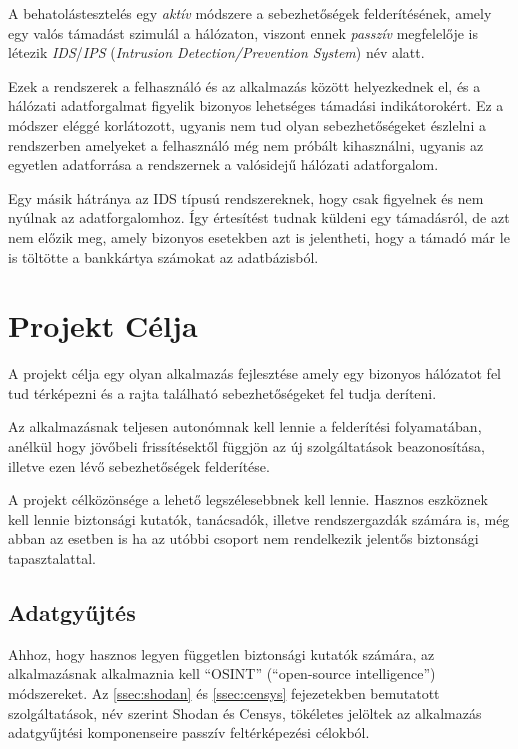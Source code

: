 \documentclass[a4paper,12pt]{article}
\begin{document}
	A behatolástesztelés egy \textit{aktív} módszere a sebezhetőségek felderítésének, amely egy valós támadást szimulál a hálózaton, viszont ennek \textit{passzív} megfelelője is létezik \textit{IDS}/\textit{IPS} (\textit{Intrusion Detection/Prevention System}) név alatt.
	
	Ezek a rendszerek a felhasználó és az alkalmazás között helyezkednek el, és a hálózati adatforgalmat figyelik bizonyos lehetséges támadási indikátorokért. Ez a módszer eléggé korlátozott, ugyanis nem tud olyan sebezhetőségeket észlelni a rendszerben amelyeket a felhasználó még nem próbált kihasználni, ugyanis az egyetlen adatforrása a rendszernek a valósidejű hálózati adatforgalom.
	
	Egy másik hátránya az IDS típusú rendszereknek, hogy csak figyelnek és nem nyúlnak az adatforgalomhoz. Így értesítést tudnak küldeni egy támadásról, de azt nem előzik meg, amely bizonyos esetekben azt is jelentheti, hogy a támadó már le is töltötte a bankkártya számokat az adatbázisból.

\section{Projekt Célja}

	A projekt célja egy olyan alkalmazás fejlesztése amely egy bizonyos hálózatot fel tud térképezni és a rajta található sebezhetőségeket fel tudja deríteni.
	
	Az alkalmazásnak teljesen autonómnak kell lennie a felderítési folyamatában, anélkül hogy jövőbeli frissítésektől függjön az új szolgáltatások beazonosítása, illetve ezen lévő sebezhetőségek felderítése.

	A projekt célközönsége a lehető legszélesebbnek kell lennie. Hasznos eszköznek kell lennie biztonsági kutatók, tanácsadók, illetve rendszergazdák számára is, még abban az esetben is ha az utóbbi csoport nem rendelkezik jelentős biztonsági tapasztalattal.

\subsection{Adatgyűjtés}

	Ahhoz, hogy hasznos legyen független biztonsági kutatók számára, az alkalmazásnak alkalmaznia kell ``OSINT'' (``open-source intelligence'') módszereket. Az \ref{ssec:shodan} és \ref{ssec:censys} fejezetekben bemutatott szolgáltatások, név szerint Shodan\cite{shodan16} és Censys\cite{censys15}, tökéletes jelöltek az alkalmazás adatgyűjtési komponenseire passzív feltérképezési célokból.
	
\end{document}
